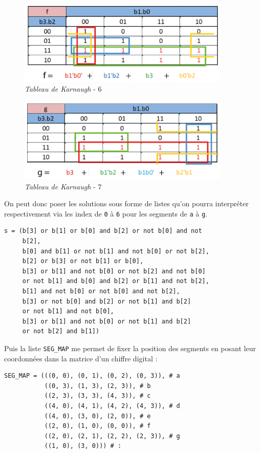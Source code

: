 \begin{figure}[h!]
    \centering
    \includegraphics[width=0.9\textwidth]{IMG/tab_de_K_6.png}
    \caption{\textit{Tableau de Karnaugh} - 6}
    \label{fig:colorpicker}
\end{figure}
\newpage

\begin{figure}[h!]
    \centering
    \includegraphics[width=0.9\textwidth]{IMG/tab_de_K_7.png}
    \caption{\textit{Tableau de Karnaugh} - 7}
    \label{fig:colorpicker}
\end{figure}
\medskip

On peut donc poser les solutions sous forme de listes qu'on pourra interpréter respectivement via les index de \texttt{0} à \texttt{6} pour les segments de \texttt{a} à \texttt{g}.
\begin{lstlisting}
s = (b[3] or b[1] or b[0] and b[2] or not b[0] and not 
     b[2],
     b[0] and b[1] or not b[1] and not b[0] or not b[2],
     b[2] or b[3] or not b[1] or b[0],
     b[3] or b[1] and not b[0] or not b[2] and not b[0] 
     or not b[1] and b[0] and b[2] or b[1] and not b[2],
     b[1] and not b[0] or not b[0] and not b[2],
     b[3] or not b[0] and b[2] or not b[1] and b[2] 
     or not b[1] and not b[0],
     b[3] or b[1] and not b[0] or not b[1] and b[2] 
     or not b[2] and b[1])
\end{lstlisting}
\medskip

Puis la liste \texttt{SEG\_MAP} me permet de fixer la position des segments en posant leur coordonnées dans la matrice d'un chiffre digital :
\begin{lstlisting}
SEG_MAP = (((0, 0), (0, 1), (0, 2), (0, 3)), # a
           ((0, 3), (1, 3), (2, 3)), # b
           ((2, 3), (3, 3), (4, 3)), # c
           ((4, 0), (4, 1), (4, 2), (4, 3)), # d
           ((4, 0), (3, 0), (2, 0)), # e
           ((2, 0), (1, 0), (0, 0)), # f
           ((2, 0), (2, 1), (2, 2), (2, 3)), # g
           ((1, 0), (3, 0))) # :
\end{lstlisting}
\medskip

